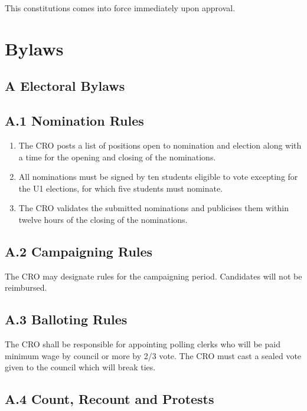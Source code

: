 This constitutions comes into force immediately upon approval.

\section{Bylaws}\label{bylaws}

\subsection{A Electoral Bylaws}\label{a-electoral-bylaws}

\subsection{A.1 Nomination Rules}\label{a.1-nomination-rules}

\begin{enumerate}
\def\labelenumi{\arabic{enumi}.}
\item
  The CRO posts a list of positions open to nomination and election
  along with a time for the opening and closing of the nominations.
\item
  All nominations must be signed by ten students eligible to vote
  excepting for the U1 elections, for which five students must nominate.
\item
  The CRO validates the submitted nominations and publicises them within
  twelve hours of the closing of the nominations.
\end{enumerate}

\subsection{A.2 Campaigning Rules}\label{a.2-campaigning-rules}

The CRO may designate rules for the campaigning period. Candidates will
not be reimbursed.

\subsection{A.3 Balloting Rules}\label{a.3-balloting-rules}

The CRO shall be responsible for appointing polling clerks who will be
paid minimum wage by council or more by 2/3 vote. The CRO must cast a
sealed vote given to the council which will break ties.

\subsection{A.4 Count, Recount and
Protests}\label{a.4-count-recount-and-protests}

